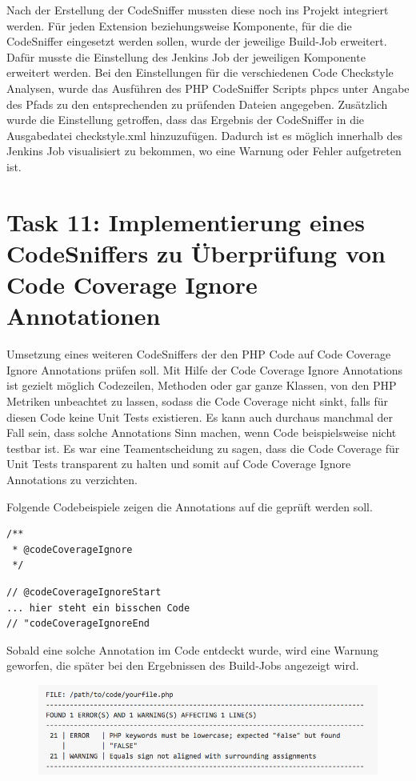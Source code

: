 \documentclass[11pt,a4paper]{article} %
\begin{document}
Nach der Erstellung der CodeSniffer mussten diese noch ins Projekt integriert werden.
Für jeden Extension beziehungsweise Komponente, für die die CodeSniffer eingesetzt werden sollen,
wurde der jeweilige Build-Job erweitert. Dafür musste die Einstellung des Jenkins Job der jeweiligen 
Komponente erweitert werden. Bei den Einstellungen für die verschiedenen Code Checkstyle Analysen,
wurde das Ausführen des PHP CodeSniffer Scripts phpcs unter Angabe des Pfads zu den entsprechenden zu
prüfenden Dateien angegeben. Zusätzlich wurde die Einstellung getroffen, dass das Ergebnis der CodeSniffer
in die Ausgabedatei checkstyle.xml hinzuzufügen. Dadurch ist es möglich innerhalb des Jenkins Job
visualisiert zu bekommen, wo eine Warnung oder Fehler aufgetreten ist.



\section{Task 11: Implementierung eines CodeSniffers zu Überprüfung von Code Coverage Ignore Annotationen}

Umsetzung eines weiteren CodeSniffers der den PHP Code auf Code Coverage Ignore Annotations prüfen soll.
Mit Hilfe der Code Coverage Ignore Annotations ist gezielt möglich Codezeilen, Methoden oder gar ganze 
Klassen, von den PHP Metriken unbeachtet zu lassen, sodass die Code Coverage nicht sinkt, falls für
diesen Code keine Unit Tests existieren. 
Es kann auch durchaus manchmal der Fall sein, dass solche Annotations Sinn machen, wenn Code beispielsweise
nicht testbar ist. Es war eine Teamentscheidung zu sagen, dass die Code Coverage für Unit Tests transparent zu
halten und somit auf Code Coverage Ignore Annotations zu verzichten.

Folgende Codebeispiele zeigen die Annotations auf die geprüft werden soll.

\begin{lstlisting} 
/**
 * @codeCoverageIgnore
 */
\end{lstlisting} 

\begin{lstlisting} 
// @codeCoverageIgnoreStart
... hier steht ein bisschen Code
// "codeCoverageIgnoreEnd
\end{lstlisting} 

Sobald eine solche Annotation im Code entdeckt wurde, wird eine Warnung geworfen, die später bei den Ergebnissen des Build-Jobs angezeigt wird.

\begin{figure}[h]
\includegraphics[width=\textwidth]{images/snifferResult.png}
\centering
\end{figure}
\end{document}
